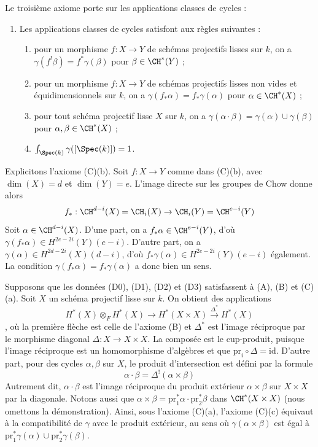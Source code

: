 \noindent
Le troisième axiome porte sur les applications classes de cycles :
\begin{enumerate}
\item[(C)] Les applications classes de cycles satisfont aux règles suivantes :
\begin{enumerate}
\item pour un morphisme $f : X \to Y$ de schémas projectifs lisses sur
$k$, on a $\gamma(f^!\beta) = f^*\gamma(\beta)$ pour $\beta \in \CH^*(Y)$ ;
\item pour un morphisme $f : X \to Y$ de schémas projectifs lisses non vides
et équidimensionnels sur $k$, on a
$\gamma(f_*\alpha) = f_*\gamma(\alpha)$ pour $\alpha \in \CH^*(X)$ ;
\item pour tout schéma projectif lisse $X$ sur $k$, on a
$\gamma(\alpha \cdot \beta) = \gamma(\alpha) \cup \gamma(\beta)$
pour $\alpha, \beta \in \CH^*(X)$ ;
\item $\int_{\Spec(k)} \gamma([\Spec(k)]) = 1$.
\end{enumerate}
\end{enumerate}
Explicitons l'axiome (C)(b). Soit $f : X \to Y$
comme dans (C)(b), avec $\dim(X) = d$ et $\dim(Y) = e$. L'image directe
sur les groupes de Chow donne alors
$$
f_* : \CH^{d - i}(X) = \CH_i(X) \to \CH_i(Y) = \CH^{e - i}(Y)
$$
Soit $\alpha \in \CH^{d - i}(X)$. D'une part, on a
$f_*\alpha \in \CH^{e - i}(Y)$, d'où
$\gamma(f_*\alpha) \in H^{2e - 2i}(Y)(e - i)$.
D'autre part, on a
$\gamma(\alpha) \in H^{2d - 2i}(X)(d - i)$, d'où
$f_*\gamma(\alpha) \in H^{2e - 2i}(Y)(e - i)$ également.
La condition $\gamma(f_*\alpha) = f_*\gamma(\alpha)$ a donc bien un sens.

\begin{remark}
\label{remark-replace-cup-product}
Supposons que les données (D0), (D1), (D2) et (D3) satisfassent à (A), (B) et (C)(a).
Soit $X$ un schéma projectif lisse sur $k$. On obtient des applications
$$
H^*(X) \otimes_F H^*(X) \longrightarrow H^*(X \times X)
\xrightarrow{\Delta^*} H^*(X)
$$,
où la première flèche est celle de l'axiome (B) et $\Delta^*$
est l'image réciproque par le morphisme diagonal $\Delta : X \to X \times X$.
La composée est le cup-produit, puisque l'image réciproque est un homomorphisme d'algèbres
et que $\text{pr}_i \circ \Delta = \text{id}$.
D'autre part, pour des cycles $\alpha, \beta$ sur $X$,
le produit d'intersection est défini par la formule
$$
\alpha \cdot \beta =
\Delta^!(\alpha \times \beta)
$$
Autrement dit, $\alpha \cdot \beta$ est l'image réciproque du
produit extérieur $\alpha \times \beta$ sur $X \times X$ par
la diagonale. Notons aussi que
$\alpha \times \beta = \text{pr}_1^*\alpha \cdot \text{pr}_2^*\beta$
dans $\CH^*(X \times X)$ (nous omettons la démonstration). Ainsi, sous l'axiome (C)(a),
l'axiome (C)(c) équivaut à la compatibilité de $\gamma$
avec le produit extérieur, au sens où
$\gamma(\alpha \times \beta)$ est égal à
$\text{pr}_1^*\gamma(\alpha) \cup \text{pr}_2^*\gamma(\beta)$.
\end{remark}

